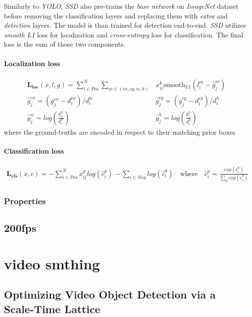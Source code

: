 Similarly to \textit{YOLO}, \textit{SSD} also pre-trains the \textit{base network} on \textit{ImageNet} dataset before removing the classification layers and replacing them with \textit{extra} and \textit{detection} layers. The model is than trained for detection end-to-end. \textit{SSD} utilizes \textit{smooth L1} loss for localization and \textit{cross-entropy} loss for classification. The final loss is the sum of those two components.

\paragraph{Localization loss}

\begin{align*}
\mathbf{L_{\text{loc}}}(x,l,g) = \sum_{i\in Pos}^N \sum_{m\in(cx, cy, w, h)} &x_{ij}^k\text{smooth}_{L1}(l_i^m-\hat{g}_j^m) \\
\hat{g}_j^{cx} = (g_j^{cx} - d_i^{cx}) / d_i^{w} \qquad& \hat{g}_j^{cy} = (g_j^{cy} - d_i^{cy}) / d_i^{h} \\
\hat{g}_j^{w} = log(\frac{g_j^{w}}{d_i^w}) \qquad& \hat{g}_j^{h} = log(\frac{g_j^{h}}{d_i^h})
\end{align*}
where the ground-truths are encoded in respect to their matching prior boxes


\paragraph{Classification loss}
\begin{align*}
\mathbf{L_{\text{cls}}}(x,c) = -\sum_{i\in Pos}^N x_{ij}^p log(\hat{c}_i^p) - \sum_{i \in Neg} log(\hat{c}_i^0) \quad\text{where} \quad\hat{c}_i^p = \frac{exp(c_i^p)}{\sum_p exp(c_i^p)}
\end{align*}



\subsubsection{Properties}


\subsection{200fps}

\section{video smthing}
\subsection{Optimizing Video Object Detection via a Scale-Time Lattice}

